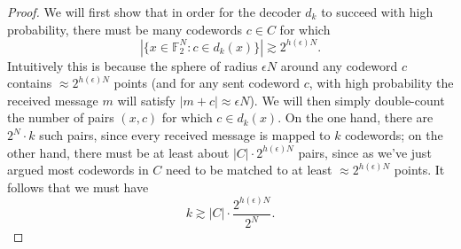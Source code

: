\documentclass[12pt]{article}
\newcommand{\F}{\mathbb{F}}
\begin{document}
\begin{proof}
We will first show that in order for the decoder $d_k$ to succeed with high probability, there must be many codewords $c\in C$ for which $$|\{ x\in\F_2^N:c\in d_k(x) \}|\gtrsim 2^{h(\epsilon)N}.$$
Intuitively this is because the sphere of radius $\epsilon N$ around any codeword $c$ contains $\approx2^{h(\epsilon)N}$ points (and for any sent codeword $c$, with high probability the received message $m$ will satisfy $|m+c|\approx \epsilon N$). We will then simply double-count the number of pairs $(x, c)$ for which $c\in d_k(x)$. On the one hand, there are $2^N\cdot k$ such pairs, since every received message is mapped to $k$ codewords; on the other hand, there must be at least about $|C|\cdot 2^{h(\epsilon)N}$ pairs, since as we've just argued most codewords in $C$ need to be matched to at least $\approx 2^{h(\epsilon)N}$ points. It follows that we must have
$$k\gtrsim |C|\cdot \frac{2^{h(\epsilon)N}}{2^N}.$$


\end{proof}
\end{document}
